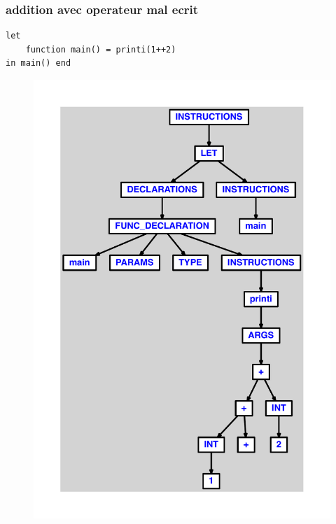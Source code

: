 \documentclass{article}
\begin{document}
\subsubsection{addition avec operateur mal ecrit}
\begin{lstlisting}
let
	function main() = printi(1++2)
in main() end
\end{lstlisting}
\newpage
\begin{figure}[H]
\centering
\includegraphics[max width=\textwidth]{ast/ast_22.pdf}
\end{figure}
\newpage
\end{document}
